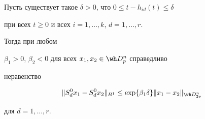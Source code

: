 \begin{thm} 


Пусть существует такое $\delta>0$, что $0\le t-h_{id}(t)\le\delta$ 


при всех $t\ge0$ и всех $i=1,\dotsc,k$, $d=1,\dotsc,r$. 


Тогда при любом 


$\beta_1>0$, $\beta_2<0$ для всех $x_1,x_2\in\wh D^n_p$ справедливо 


неравенство 


\begin{equation} 


\|S^0_d x_1-S^0_d x_2\|_{B^1}\le\exp\{\beta_1\delta\} 


\|x_1-x_2\|_{\wh D^n_{2p}} 


\end{equation} 


для $d=1,\dotsc,r$. 


\end{thm} 


 


